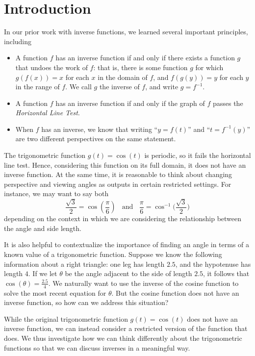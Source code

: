 \documentclass{ximera}
\begin{document}
\section{Introduction}
In our prior work with inverse functions, we learned several important principles, including
\begin{itemize}
\item
A function $f$ has an inverse function if and only if there exists a function $g$ that undoes the work of $f$: that is, there is some function $g$ for which $g(f(x)) = x$ for each $x$ in the domain of $f$, and $f(g(y)) = y$ for each $y$ in the range of $f$. We call $g$ the inverse of $f$, and write $g = f^{-1}$.%
\item
A function $f$ has an inverse function if and only if the graph of $f$ passes the {\it Horizontal Line Test}.
\item
When $f$ has an inverse, we know that writing ``$y = f(t)$'' and ``$t = f^{-1}(y)$''  are two different perspectives on the same statement.
\end{itemize}
%
\par
The trigonometric function $g(t) = \cos(t)$ is periodic, so it fails the horizontal line test. Hence, considering this function on its full domain, it does not have an inverse function. At the same time, it is reasonable to think about changing perspective and viewing angles as outputs in certain restricted settings. For instance, we may want to say both%
\begin{equation*}
\frac{\sqrt{3}}{2} = \cos\left(\frac{\pi}{6}\right) \ \ \ \ \mbox{and}  \ \ \ \ \frac{\pi}{6} = \cos^{-1}\bigg(\frac{\sqrt{3}}{2}\bigg)
\end{equation*}
depending on the context in which we are considering the relationship between the angle and side length.%

It is also helpful to contextualize the importance of finding an angle in terms of a known value of a trigonometric function. Suppose we know the following information about a right triangle: one leg has length $2.5$, and the hypotenuse has length $4$. If we let $\theta$ be the angle adjacent to the side of length $2.5$, it follows that $\cos(\theta) = \frac{2.5}{4}$. We naturally want to use the inverse of the cosine function to solve the most recent equation for $\theta$.  But the cosine function does not have an inverse function, so how can we address this situation?%

\par
While the original trigonometric function $g(t) = \cos(t)$ does not have an inverse function, we can instead consider a restricted version of the function that does. We thus investigate how we can think differently about the trigonometric functions so that we can discuss inverses in a meaningful way.%
\end{document}
